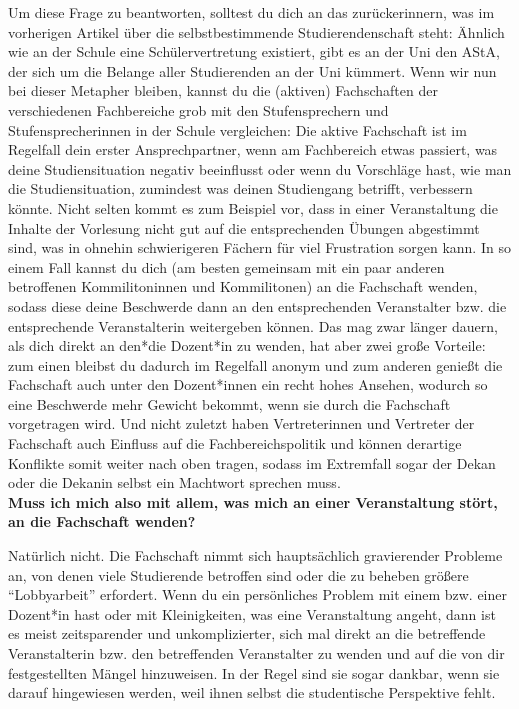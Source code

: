 {Um diese Frage zu beantworten, solltest du dich an das zurückerinnern, was im vorherigen Artikel über die selbstbestimmende Studierendenschaft steht: Ähnlich wie an der Schule eine Schülervertretung existiert, gibt es an der Uni den AStA, der sich um die Belange aller Studierenden an der Uni kümmert. Wenn wir nun bei dieser Metapher bleiben, kannst du die (aktiven) Fachschaften der verschiedenen Fachbereiche grob mit den Stufensprechern und Stufensprecherinnen in der Schule vergleichen: Die aktive Fachschaft ist im Regelfall dein erster Ansprechpartner, wenn am Fachbereich etwas passiert, was deine Studiensituation negativ beeinflusst oder wenn du Vorschläge hast, wie man die Studiensituation, zumindest was deinen Studiengang betrifft, verbessern könnte. Nicht selten kommt es zum Beispiel vor, dass in einer Veranstaltung die Inhalte der Vorlesung nicht gut auf die entsprechenden Übungen abgestimmt sind, was in ohnehin schwierigeren Fächern für viel Frustration sorgen kann. In so einem Fall kannst du dich (am besten gemeinsam mit ein paar anderen betroffenen Kommilitoninnen und Kommilitonen) an die Fachschaft wenden, sodass diese deine Beschwerde dann an den entsprechenden Veranstalter bzw. die entsprechende Veranstalterin weitergeben können. Das mag zwar länger dauern, als dich direkt an den*die Dozent*in zu wenden, hat aber zwei große Vorteile: zum einen bleibst du dadurch im Regelfall anonym und zum anderen genießt die Fachschaft auch unter den Dozent*innen ein recht hohes Ansehen, wodurch so eine Beschwerde mehr Gewicht bekommt, wenn sie durch die Fachschaft vorgetragen wird. Und nicht zuletzt haben Vertreterinnen und Vertreter der Fachschaft auch Einfluss auf die Fachbereichspolitik und können derartige Konflikte somit weiter nach oben tragen, sodass im Extremfall sogar der Dekan oder die Dekanin selbst ein Machtwort sprechen muss.\\

\textbf{Muss ich mich also mit allem, was mich an einer Veranstaltung stört, an die Fachschaft wenden?}

Natürlich nicht. Die Fachschaft nimmt sich hauptsächlich gravierender Probleme an, von denen viele Studierende betroffen sind oder die zu beheben größere "`Lobbyarbeit"' erfordert. Wenn du ein persönliches Problem mit einem bzw. einer Dozent*in hast oder mit Kleinigkeiten, was eine Veranstaltung angeht, dann ist es meist zeitsparender und unkomplizierter, sich mal direkt an die betreffende Veranstalterin bzw. den betreffenden Veranstalter zu wenden und auf die von dir festgestellten Mängel hinzuweisen. In der Regel sind sie sogar dankbar, wenn sie darauf hingewiesen werden, weil ihnen selbst die studentische Perspektive fehlt.\\

}

